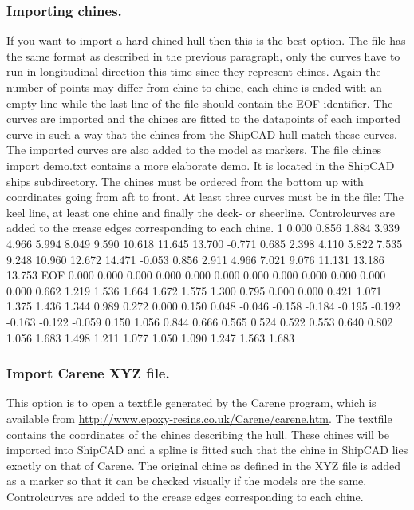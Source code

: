\documentclass[12pt]{article}
\begin{document}
\subsubsection{Importing chines.}
If you want to import a hard chined hull then this is the
best option. The file has the same format as described
in the previous paragraph, only the curves have to run in
longitudinal direction this time since they represent
chines.
Again the number of points may differ from chine to
chine, each chine is ended with an empty line while the
last line of the file should contain the EOF identifier.
The curves are imported and the chines are fitted to the
datapoints of each imported curve in such a way that
the chines from the ShipCAD hull match these curves.
The imported curves are also added to the model as
markers. The file chines import demo.txt contains a
more elaborate demo. It is located in the ShipCAD
ships subdirectory. The chines must be ordered from
the bottom up with coordinates going from aft to front.
At least three curves must be in the file: The keel line, at
least one chine and finally the deck- or sheerline.
Controlcurves are added to the crease edges
corresponding to each chine.
1
0.000
0.856
1.884
3.939
4.966
5.994
8.049
9.590
10.618
11.645
13.700
-0.771
0.685
2.398
4.110
5.822
7.535
9.248
10.960
12.672
14.471
-0.053
0.856
2.911
4.966
7.021
9.076
11.131
13.186
13.753
EOF
0.000
0.000
0.000
0.000
0.000
0.000
0.000
0.000
0.000
0.000
0.000
0.000
0.662
1.219
1.536
1.664
1.672
1.575
1.300
0.795
0.000
0.000
0.421
1.071
1.375
1.436
1.344
0.989
0.272
0.000
0.150
0.048
-0.046
-0.158
-0.184
-0.195
-0.192
-0.163
-0.122
-0.059
0.150
1.056
0.844
0.666
0.565
0.524
0.522
0.553
0.640
0.802
1.056
1.683
1.498
1.211
1.077
1.050
1.090
1.247
1.563
1.683

\subsubsection{Import Carene XYZ file.}
This option is to open a textfile generated by
the Carene program, which is available from
\url{http://www.epoxy-resins.co.uk/Carene/carene.htm}. The textfile
contains the coordinates of the chines
describing the hull. These chines will be
imported into ShipCAD and a spline is fitted
such that the chine in ShipCAD lies exactly
on that of Carene. The original chine as
defined in the XYZ file is added as a marker
so that it can be checked visually if the
models are the same. Controlcurves are
added to the crease edges corresponding to each chine.
\end{document}
